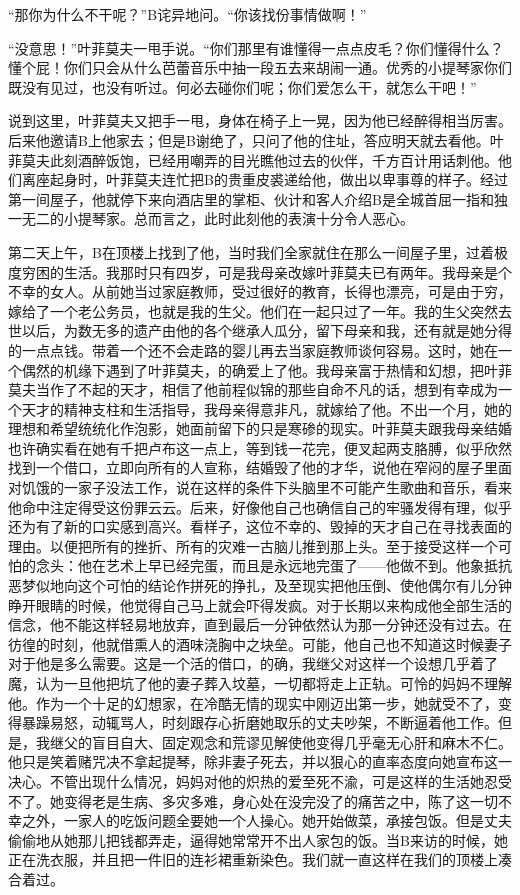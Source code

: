\documentclass[12pt, UTF8]{ctexbook}
\begin{document}
\par “那你为什么不干呢？”B诧异地问。“你该找份事情做啊！”
\par “没意思！”叶菲莫夫一甩手说。“你们那里有谁懂得一点点皮毛？你们懂得什么？懂个屁！你们只会从什么芭蕾音乐中抽一段五去来胡闹一通。优秀的小提琴家你们既没有见过，也没有听过。何必去碰你们呢；你们爱怎么干，就怎么干吧！”
\par 说到这里，叶菲莫夫又把手一甩，身体在椅子上一晃，因为他已经醉得相当厉害。后来他邀请B上他家去；但是B谢绝了，只问了他的住址，答应明天就去看他。叶菲莫夫此刻酒醉饭饱，已经用嘲弄的目光瞧他过去的伙伴，千方百计用话刺他。他们离座起身时，叶菲莫夫连忙把B的贵重皮裘递给他，做出以卑事尊的样子。经过第一间屋子，他就停下来向酒店里的掌柜、伙计和客人介绍B是全城首屈一指和独一无二的小提琴家。总而言之，此时此刻他的表演十分令人恶心。
\par 第二天上午，B在顶楼上找到了他，当时我们全家就住在那么一间屋子里，过着极度穷困的生活。我那时只有四岁，可是我母亲改嫁叶菲莫夫已有两年。我母亲是个不幸的女人。从前她当过家庭教师，受过很好的教育，长得也漂亮，可是由于穷，嫁给了一个老公务员，也就是我的生父。他们在一起只过了一年。我的生父突然去世以后，为数无多的遗产由他的各个继承人瓜分，留下母亲和我，还有就是她分得的一点点钱。带着一个还不会走路的婴儿再去当家庭教师谈何容易。这时，她在一个偶然的机缘下遇到了叶菲莫夫，的确爱上了他。我母亲富于热情和幻想，把叶菲莫夫当作了不起的天才，相信了他前程似锦的那些自命不凡的话，想到有幸成为一个天才的精神支柱和生活指导，我母亲得意非凡，就嫁给了他。不出一个月，她的理想和希望统统化作泡影，她面前留下的只是寒碜的现实。叶菲莫夫跟我母亲结婚也许确实看在她有千把卢布这一点上，等到钱一花完，便叉起两支胳膊，似乎欣然找到一个借口，立即向所有的人宣称，结婚毁了他的才华，说他在窄闷的屋子里面对饥饿的一家子没法工作，说在这样的条件下头脑里不可能产生歌曲和音乐，看来他命中注定得受这份罪云云。后来，好像他自己也确信自己的牢骚发得有理，似乎还为有了新的口实感到高兴。看样子，这位不幸的、毁掉的天才自己在寻找表面的理由。以便把所有的挫折、所有的灾难一古脑儿推到那上头。至于接受这样一个可怕的念头：他在艺术上早已经完蛋，而且是永远地完蛋了——他做不到。他象抵抗恶梦似地向这个可怕的结论作拼死的挣扎，及至现实把他压倒、使他偶尔有儿分钟睁开眼睛的时候，他觉得自己马上就会吓得发疯。对于长期以来构成他全部生活的信念，他不能这样轻易地放弃，直到最后一分钟依然认为那一分钟还没有过去。在彷徨的时刻，他就借熏人的酒味浇胸中之块垒。可能，他自己也不知道这时候妻子对于他是多么需要。这是一个活的借口，的确，我继父对这样一个设想几乎着了魔，认为一旦他把坑了他的妻子葬入坟墓，一切都将走上正轨。可怜的妈妈不理解他。作为一个十足的幻想家，在冷酷无情的现实中刚迈出第一步，她就受不了，变得暴躁易怒，动辄骂人，时刻跟存心折磨她取乐的丈夫吵架，不断逼着他工作。但是，我继父的盲目自大、固定观念和荒谬见解使他变得几乎毫无心肝和麻木不仁。他只是笑着赌咒决不拿起提琴，除非妻子死去，并以狠心的直率态度向她宣布这一决心。不管出现什么情况，妈妈对他的炽热的爱至死不渝，可是这样的生活她忍受不了。她变得老是生病、多灾多难，身心处在没完没了的痛苦之中，陈了这一切不幸之外，一家人的吃饭问题全要她一个人操心。她开始做菜，承接包饭。但是丈夫偷偷地从她那儿把钱都弄走，逼得她常常开不出人家包的饭。当B来访的时候，她正在洗衣服，并且把一件旧的连衫裙重新染色。我们就一直这样在我们的顶楼上凑合着过。
\end{document}
